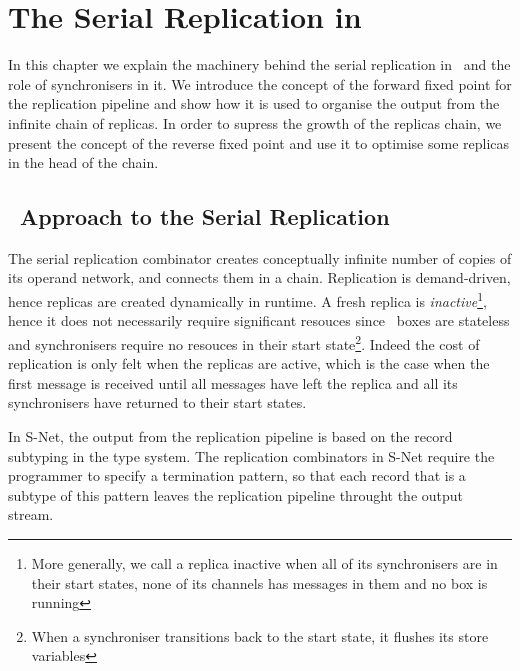 \chapter{The Serial Replication in \ak\ }
In this chapter we explain the machinery behind the serial replication in \ak\ and the role of synchronisers in it. We introduce the concept of the forward fixed point for the replication pipeline and show how it is used to organise the output from the infinite chain of replicas. In order to supress the growth of the replicas chain, we present the concept of the reverse fixed point and use it to optimise some replicas in the head of the chain.


%


    \section{\ak\ Approach to the Serial Replication}
The serial replication combinator creates conceptually infinite number of copies of its operand network, and connects them in a chain. Replication is demand-driven, hence replicas are created dynamically in runtime. A fresh replica is \emph{inactive}\footnote{More generally, we call a replica inactive when all of its synchronisers are in their start states, none of its channels has messages in them and no box is running}, hence it does not necessarily require significant resouces since \ak\ boxes are stateless and synchronisers require no resouces in their start state\footnote{When a synchroniser transitions back to the start state, it flushes its store variables}. Indeed the cost of replication is only felt when the replicas are active, which is the case when the first message is received until all messages have left the replica and all its synchronisers have returned to their start states.

In S-Net, the output from the replication pipeline is based on the record subtyping in the type system. The replication combinators in S-Net require the programmer to specify a termination pattern, so that each record that is a subtype of this pattern leaves the replication pipeline throught the output stream.

